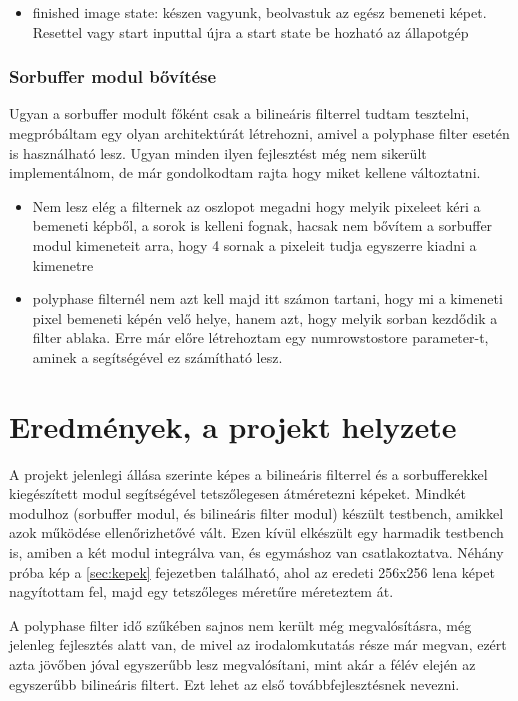 \begin{itemize}
	\item finished image state: készen vagyunk, beolvastuk az egész bemeneti képet. Resettel vagy start inputtal újra a start state be hozható az állapotgép
\end{itemize}

\subsection{Sorbuffer modul bővítése}

Ugyan a sorbuffer modult főként csak a bilineáris filterrel tudtam tesztelni, megpróbáltam egy olyan architektúrát létrehozni, amivel a polyphase filter esetén is használható lesz. Ugyan minden ilyen fejlesztést még nem sikerült implementálnom, de már gondolkodtam rajta hogy miket kellene változtatni. 
\begin{itemize}
	\item Nem lesz elég a filternek az oszlopot megadni hogy melyik pixeleet kéri a bemeneti képből, a sorok is kelleni fognak, hacsak nem bővítem a sorbuffer modul kimeneteit arra, hogy 4 sornak a pixeleit tudja egyszerre kiadni a kimenetre
	\item polyphase filternél nem azt kell majd itt számon tartani, hogy mi a kimeneti pixel bemeneti képén velő helye, hanem azt, hogy melyik sorban kezdődik a filter ablaka. Erre már előre létrehoztam egy numrowstostore parameter-t, aminek a segítségével ez számítható lesz.
\end{itemize}

\chapter{Eredmények, a projekt helyzete}

A projekt jelenlegi állása szerinte képes a bilineáris filterrel és a sorbufferekkel kiegészített modul segítségével tetszőlegesen átméretezni képeket. Mindkét modulhoz (sorbuffer modul, és bilineáris filter modul) készült testbench, amikkel azok működése ellenőrizhetővé vált. Ezen kívül elkészült egy harmadik testbench is, amiben a két modul integrálva van, és egymáshoz van csatlakoztatva. Néhány próba kép a \ref{sec:kepek} fejezetben található, ahol az eredeti 256x256 lena képet nagyítottam fel, majd egy tetszőleges méretűre méreteztem át.

A polyphase filter idő szűkében sajnos nem került még megvalósításra, még jelenleg fejlesztés alatt van, de mivel az irodalomkutatás része már megvan, ezért azta jövőben jóval egyszerűbb lesz megvalósítani, mint akár a félév elején az egyszerűbb bilineáris filtert. Ezt lehet az első továbbfejlesztésnek nevezni.

